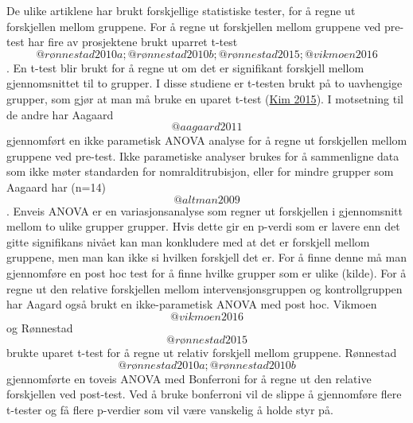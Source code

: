 \documentclass[
]{book}
\begin{document}
De ulike artiklene har brukt forskjellige statistiske tester, for å
regne ut forskjellen mellom gruppene. For å regne ut forskjellen mellom
gruppene ved pre-test har fire av prosjektene brukt uparret t-test
\[@rønnestad2010a; @rønnestad2010b; @rønnestad2015; @vikmoen2016\]. En
t-test blir brukt for å regne ut om det er signifikant forskjell mellom
gjennomsnittet til to grupper. I disse studiene er t-testen brukt på to
uavhengige grupper, som gjør at man må bruke en uparet t-test
(\protect\hyperlink{ref-kim2015}{Kim 2015}). I motsetning til de andre
har Aagaard \[@aagaard2011\] gjennomført en ikke parametisk ANOVA
analyse for å regne ut forskjellen mellom gruppene ved pre-test. Ikke
parametiske analyser brukes for å sammenligne data som ikke møter
standarden for nomralditrubisjon, eller for mindre grupper som Aagaard
har (n=14) \[@altman2009\]. Enveis ANOVA er en variasjonsanalyse som
regner ut forskjellen i gjennomsnitt mellom to ulike grupper grupper.
Hvis dette gir en p-verdi som er lavere enn det gitte signifikans nivået
kan man konkludere med at det er forskjell mellom gruppene, men man kan
ikke si hvilken forskjell det er. For å finne denne må man gjennomføre
en post hoc test for å finne hvilke grupper som er ulike (kilde). For å
regne ut den relative forskjellen mellom intervensjonsgruppen og
kontrollgruppen har Aagard også brukt en ikke-parametisk ANOVA med post
hoc. Vikmoen \[@vikmoen2016\] og Rønnestad \[@rønnestad2015\] brukte
uparet t-test for å regne ut relativ forskjell mellom gruppene.
Rønnestad \[@rønnestad2010a; @rønnestad2010b\] gjennomførte en toveis
ANOVA med Bonferroni for å regne ut den relative forskjellen ved
post-test. Ved å bruke bonferroni vil de slippe å gjennomføre flere
t-tester og få flere p-verdier som vil være vanskelig å holde styr på.

\hypertarget{section}{%
\section{}\label{section}}
\end{document}

